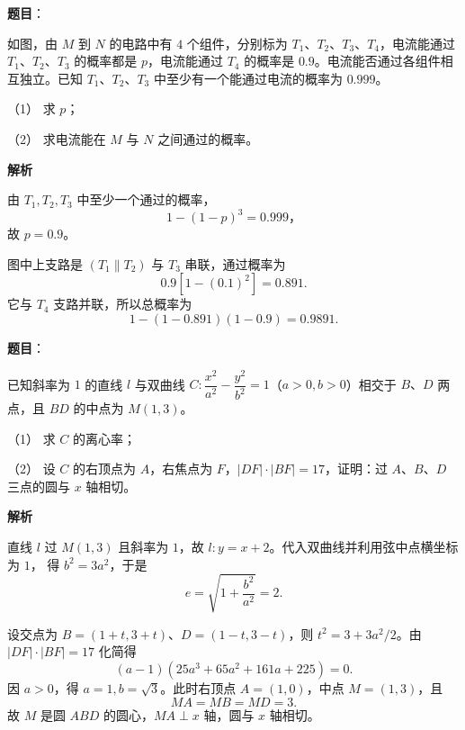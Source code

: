 \begin{answer}

\textbf{题目}：

如图，由 $M$ 到 $N$ 的电路中有 $4$ 个组件，分别标为 $T_1\text{、}T_2\text{、}T_3\text{、}T_4$，电流能通过 $T_1\text{、}T_2\text{、}T_3$ 的概率都是 $p$，电流能通过 $T_4$ 的概率是 $0.9$。电流能否通过各组件相互独立。已知 $T_1\text{、}T_2\text{、}T_3$ 中至少有一个能通过电流的概率为 $0.999$。
\nopagebreak[4]
\begin{center}\end{center}
\nopagebreak[4]
（1） 求 $p$；

（2） 求电流能在 $M$ 与 $N$ 之间通过的概率。

\textbf{解析}


由 $T_1,T_2,T_3$ 中至少一个通过的概率，
\nopagebreak[4]
\[
1-(1-p)^3=0.999\text{，}
\]
故 $p=0.9$。


图中上支路是 $(T_1\parallel T_2)$ 与 $T_3$ 串联，通过概率为
\nopagebreak[4]
\[
0.9[1-(0.1)^2]=0.891.
\]
它与 $T_4$ 支路并联，所以总概率为
\nopagebreak[4]
\[
1-(1-0.891)(1-0.9)=0.9891.
\]



\end{answer}
\begin{answer}

\textbf{题目}：

已知斜率为 $1$ 的直线 $l$ 与双曲线 $C:\dfrac{x^2}{a^2}-\dfrac{y^2}{b^2}=1$（$a>0,b>0$）相交于 $B\text{、}D$ 两点，且 $BD$ 的中点为 $M(1,3)$。

（1） 求 $C$ 的离心率；

（2） 设 $C$ 的右顶点为 $A$，右焦点为 $F$，$|DF|\cdot|BF|=17$，证明：过 $A\text{、}B\text{、}D$ 三点的圆与 $x$ 轴相切。

\textbf{解析}


直线 $l$ 过 $M(1,3)$ 且斜率为 $1$，故 $l:y=x+2$。代入双曲线并利用弦中点横坐标为 $1$，
得 $b^2=3a^2$，于是
\nopagebreak[4]
\[
e=\sqrt{1+\frac{b^2}{a^2}}=2.
\]


设交点为 $B=(1+t,3+t)$、$D=(1-t,3-t)$，则
$t^2=3+3a^2/2$。由 $|DF|\cdot|BF|=17$ 化简得
\nopagebreak[4]
\[
(a-1)(25a^3+65a^2+161a+225)=0.
\]
因 $a>0$，得 $a=1,b=\sqrt3$。此时右顶点 $A=(1,0)$，中点 $M=(1,3)$，且
\nopagebreak[4]
\[
MA=MB=MD=3.
\]
故 $M$ 是圆 $ABD$ 的圆心，$MA\perp x$ 轴，圆与 $x$ 轴相切。



\end{answer}
